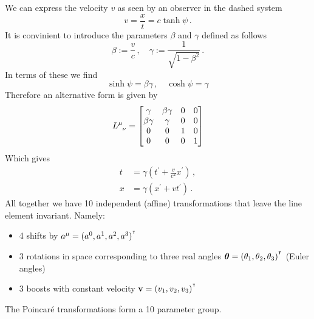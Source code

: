   We can express the velocity $v$ as seen by an observer in the dashed system
  \begin{equation}
  v=\frac{x}{t}=c\tanh\psi\,.
  \end{equation}
  It is convinient to introduce the parameters $\beta$ and $\gamma$ defined as
  follows
  \begin{equation}
  \beta:=\frac{v}{c}\, ,\quad\gamma:=\frac{1}{\sqrt{1-\beta^2}}\, .
  \end{equation}
  In terms of these we find
  \begin{equation}
  \sinh\psi = \beta\gamma\, , \quad \cosh\psi=\gamma
  \end{equation}
  Therefore an alternative form is given by
  \begin{equation}
  \tensor{L}{^\mu_\nu}=\begin{bmatrix}
  \gamma&\beta\gamma & 0&0\\
  \beta\gamma&\gamma &0&0\\
  0&0&1 &0\\
  0&0 &0 &1
  \end{bmatrix}
  \end{equation}
  Which gives 
  \begin{align}
  t&=\gamma\left(t^\prime+\frac{v}{c^2}x^\prime\right)\, ,\\
  x&=\gamma\left(x^\prime+vt^\prime\right)\, .
  \end{align}
All together we have 10 independent (affine) transformations that leave the line
element invariant. Namely:
\begin{itemize}
  \item 4 shifts by $a^\mu=(a^0,a^1,a^2,a^3)^{^\intercal}$
  \item 3 rotations in space corresponding to three real angles
  $\boldsymbol{\theta}=(\theta_1,\theta_2,\theta_3)^{^\intercal}$ (Euler angles)
  \item 3 boosts with constant velocity $\mathbf{v}=(v_1,v_2,v_3)^{^\intercal}$
\end{itemize}
The Poincaré transformations form a 10 parameter group.
